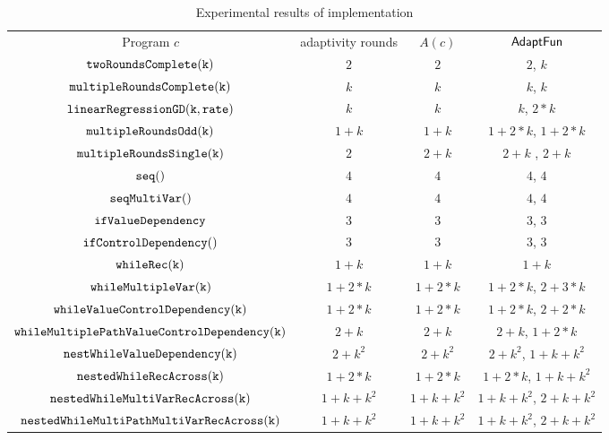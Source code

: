 \begin {table}[H]
        \vspace{-0.3cm}
    \caption{Experimental results of {\THESYSTEM} implementation}
        \label{tb:imp}
        \begin{center}
        \vspace{-0.3cm}
{\footnotesize
        \begin{tabular}{ c c c c}
         Program $c$ & adaptivity rounds & $A(c)$ & $\textsf{AdaptFun}$ \\ 
         $ \mathtt{twoRoundsComplete(k)}$ & $2$ & $2$ & $2$, $k$ \\
         $ \mathtt{multipleRoundsComplete(k)}$ & $k$ & $k$ & $k$, $k$  \\
         $\mathtt{linearRegressionGD(k, rate)}$ & $k$ & $k$ & $k$, $2 * k$  \\
         $ \mathtt{multipleRoundsOdd(k)}$ & $1 + k$ & $1 + k$ & $1 + 2*k$, $1 + 2*k$  \\
         $ \mathtt{multipleRoundsSingle(k)}$ & $2$ & $2 + k$ & $2 + k$ , $2 + k$  \\
         $\mathtt{seq()}$ & $4$ & $4$ & $4$, $4$  \\ 
         $\mathtt{seqMultiVar()}$ & $4$ & $4$ & $4$, $4$ \\  
         $ \mathtt{ifValueDependency}$ & $3$ & $3$ & $3$, $3$ \\
         $\mathtt{ifControlDependency()}$ & $3$ & $3$ & $3$, $3$  \\
         $ \mathtt{whileRec(k)}$ & $1+k$ & $1+k$ & $1+k$  \\
         $ \mathtt{whileMultipleVar(k)}$ & $1 + 2*k$ & $1 + 2*k$ & $1 + 2*k$, $2 + 3 * k$  \\
         $ \mathtt{whileValueControlDependency(k)}$ & $1 + 2*k$ & $1 + 2*k$ & $1 + 2 * k$, $2 + 2 * k$  \\
         $ \mathtt{whileMultiplePathValueControlDependency(k)}$ & $2 + k$ & $2 + k$  & $2 + k$, $1 + 2 * k$   \\
         $ \mathtt{nestWhileValueDependency(k)}$ & $2 + k^2$ & $2 + k^2$  & $2 + k^2$, $1 + k + k^2$   \\
         $ \mathtt{nestedWhileRecAcross(k)}$ & $1 + 2*k$ & $1 + 2*k$ & $1 + 2*k$,  $1 + k + k^2$   \\
         $ \mathtt{nestedWhileMultiVarRecAcross(k)}$ & $1 + k + k^2$ & $1 + k + k^2$  & $1 + k + k^2$,  $2 + k + k^2$  \\
         $ \mathtt{nestedWhileMultiPathMultiVarRecAcross(k)}$ & $1 + k + k^2$ & $1 + k + k^2$  & $1 + k + k^2$,  $2 + k + k^2$  \\
        \end{tabular}
}        
\end{center}
\end{table}
